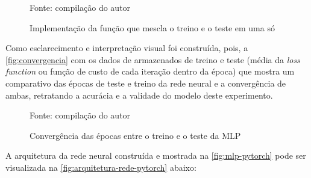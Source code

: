 \begin{figure}[H]
	\centering
	\caption{Implementação da função que mescla o treino e o teste em uma só}
	
	\label{fig:forward}
	{\scriptsize Fonte: compilação do autor}
\end{figure}

Como esclarecimento e interpretação visual foi construída, pois, a \autoref{fig:convergencia} com os dados de armazenados de treino e teste (média da \textit{loss function} ou função de custo de cada iteração dentro da época) que mostra um comparativo das épocas de teste e treino da rede neural e a convergência de ambas, retratando a acurácia e a validade do modelo deste experimento.

\begin{figure}
	\centering
	\caption{Convergência das épocas entre o treino e o teste da MLP}
	
	\label{fig:convergencia}
	{\scriptsize Fonte: compilação do autor}
\end{figure}

A arquitetura da rede neural construída e mostrada na \autoref{fig:mlp-pytorch} pode ser visualizada na \autoref{fig:arquitetura-rede-pytorch} abaixo:

